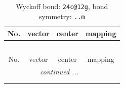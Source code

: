 \documentclass[fleqn,8pt]{jsarticle}
\begin{document}
\renewcommand{\arraystretch}{1.2}
\begin{longtable}{cccc}
\caption{Wyckoff bond: {\tt 24c@12g}, bond symmetry: {\tt ..m}}
 \\
 \hline \hline
No. & vector & center & mapping \\ \hline \endfirsthead

\multicolumn{3}{l}{\tablename\ \thetable{}} \\
 \hline \hline
No. & vector & center & mapping \\ \hline \endhead

 \hline \hline
\multicolumn{3}{r}{\footnotesize\it continued ...} \\ \endfoot

 \hline \hline
\multicolumn{3}{r}{} \\ \endlastfoot


\end{longtable}
\end{document}
